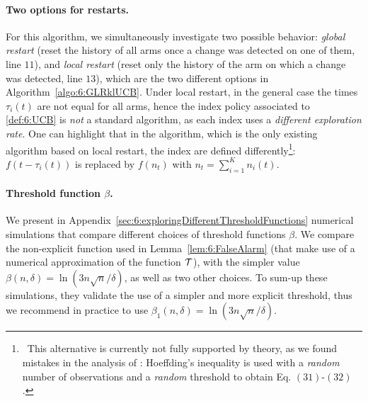 \paragraph{Two options for restarts.}
%
For this algorithm, we simultaneously investigate two possible behavior: \emph{global restart} (reset the history of all arms once a change was detected on one of them, line $11$), and \emph{local restart} (reset only the history of the arm on which a change was detected, line $13$), which are the two different options in Algorithm~\ref{algo:6:GLRklUCB}.
%
Under local restart, in the general case the times $\tau_i(t)$ are not equal for all arms, hence the index policy associated to \eqref{def:6:UCB} is \emph{not} a standard \UCB{} algorithm, as each index uses a \emph{different exploration rate}.
%
One can highlight that in the \CUSUMUCB{} algorithm, which is the only existing algorithm based on local restart, the \UCB{} index are defined differently\footnote{~This alternative is currently not fully supported by theory, as we found mistakes in the analysis of \CUSUMUCB: Hoeffding's inequality is used with a \emph{random} number of observations and a \emph{random} threshold to obtain Eq. $(31)$-$(32)$.}:
$f(t-\tau_i(t))$ is replaced by $f(n_t)$ with $n_t = \sum_{i=1}^K n_i(t)$.


\paragraph{Threshold function $\beta$.}

We present in Appendix~\ref{sec:6:exploringDifferentThresholdFunctions} numerical simulations that compare different choices of threshold functions $\beta$.
We compare the non-explicit function used in Lemma~\ref{lem:6:FalseAlarm} (that make use of a numerical approximation of the function $\mathcal{T}$),
with the simpler value $\beta(n,\delta) = \ln(3n\sqrt{n}/\delta)$, as well as two other choices.
To sum-up these simulations, they validate the use of a simpler and more explicit threshold, thus we recommend in practice to use $\beta_1(n,\delta) = \ln(3n\sqrt{n}/\delta)$.



